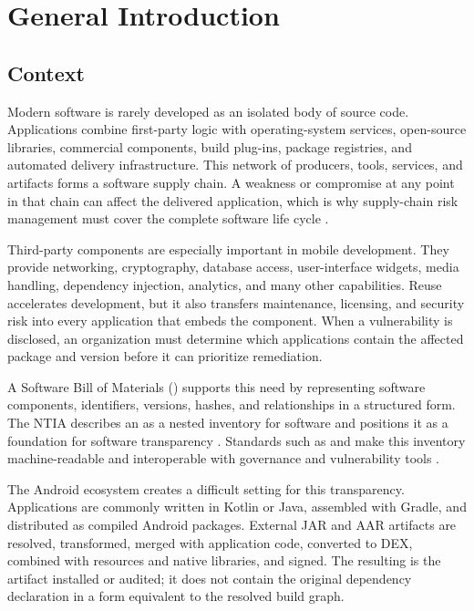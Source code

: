 \chapter{General Introduction}
\label{ch:pfe-introduction}

\section{Context}

Modern software is rarely developed as an isolated body of source code.
Applications combine first-party logic with operating-system services,
open-source libraries, commercial components, build plug-ins, package
registries, and automated delivery infrastructure. This network of producers,
tools, services, and artifacts forms a software supply chain. A weakness or
compromise at any point in that chain can affect the delivered application,
which is why supply-chain risk management must cover the complete software
life cycle \cite{nist2022csc}.

Third-party components are especially important in mobile development. They
provide networking, cryptography, database access, user-interface widgets,
media handling, dependency injection, analytics, and many other capabilities.
Reuse accelerates development, but it also transfers maintenance,
licensing, and security risk into every application that embeds the component.
When a vulnerability is disclosed, an organization must determine which
applications contain the affected package and version before it can prioritize
remediation.

A Software Bill of Materials (\SBOM) supports this need by representing
software components, identifiers, versions, hashes, and relationships in a
structured form. The NTIA describes an \SBOM as a nested inventory for
software and positions it as a foundation for software transparency
\cite{ntiaSbom}. Standards such as \SPDX and \CycloneDX make this inventory
machine-readable and interoperable with governance and vulnerability tools
\cite{spdxSpecification,cyclonedxSpecification}.

The Android ecosystem creates a difficult setting for this transparency.
Applications are commonly written in Kotlin or Java, assembled with Gradle,
and distributed as compiled Android packages. External JAR and AAR artifacts
are resolved, transformed, merged with application code, converted to DEX,
combined with resources and native libraries, and signed. The resulting
\APK is the artifact installed or audited; it does not contain the original
dependency declaration in a form equivalent to the resolved build graph.

